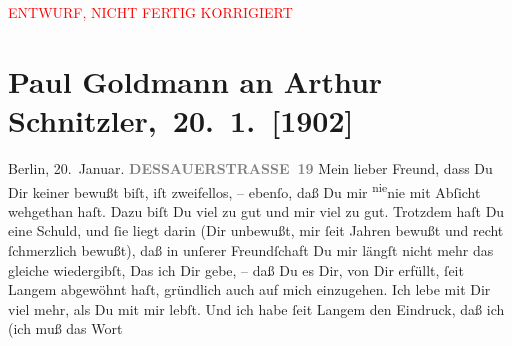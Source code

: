 
\begin{center}
            \textcolor{red}{ENTWURF, NICHT FERTIG KORRIGIERT}
                      \end{center}
            
         
         \renewcommand{\erwaehntePersonen}{Personen: Gerhart Hauptmann}
         \renewcommand{\erwaehnteOrte}{Orte: Berlin, Dessauer Straße, Wien}
         \renewcommand{\erwaehnteWerke}{Werke: Berliner Theater. »Einsame Menschen« im Deutschen Theater}
               \section[ Paul Goldmann an Arthur Schnitzler, 20. 1. {[}1902{]}]{ Paul Goldmann an Arthur Schnitzler, 20. 1. {[}1902{]}}\nopagebreak{}\rehead{ }\begin{ledgroupsized}[t]{13cm}\normalsize\beginnumbering \toendnotes[C]{\smallbreak\pagebreak[2]} 
\toendnotes[C]{\smallbreak}\pstart
           {\pb}Berlin, 20. Januar.\pend
           \pstart
           \raggedleft{}\textcolor{gray}{\textbf{DESSAUERSTRASSE 19}}\pend
           \pstart
           Mein lieber Freund, dass Du Dir keiner \label{K_L03194-1v}\label{K_L03194-1h} bewußt biſt, iſt zweifellos, – ebenſo, daß Du mir \substVorne{}\textsuperscript{nie}\substDazwischen{}nie\substHinten{} mit Abſicht wehgethan haſt. Dazu biſt Du viel zu gut und mir viel zu gut.
                   Trotzdem haſt Du eine Schuld, und ſie liegt darin (Dir unbewußt, mir ſeit
               Jahren bewußt und recht ſchmerzlich bewußt), daß in unſerer Freundſchaft Du mir
               längſt nicht mehr das gleiche wiedergibſt, \introOben{}D\introOben{}as ich Dir gebe, – daß Du  es Dir, von Dir erfüllt, ſeit Langem abgewöhnt haſt,  gründlich auch auf mich einzugehen. Ich lebe mit Dir viel mehr, als Du
               mit mir lebſt. Und ich habe ſeit Langem den Eindruck, daß ich (ich muß das Wort

\end{ledgroupsized}
